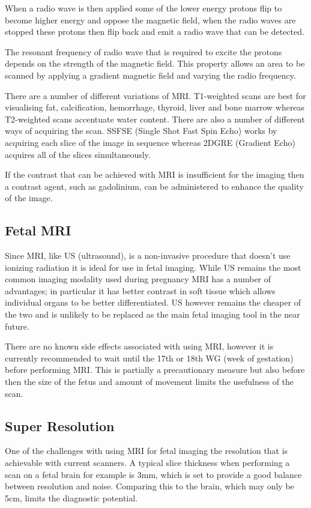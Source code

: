 \documentclass[
  oneside,
  11pt, a4paper,
  footinclude=true,
  headinclude=true,
  cleardoublepage=empty
]{scrbook}
\begin{document}
When a radio wave is then applied some of the lower energy protons flip to become higher energy and oppose the magnetic field, when the radio waves are stopped these protons then flip back and emit a radio wave that can be detected.

The resonant frequency of radio wave that is required to excite the protons depends on the strength of the magnetic field. This property allows an area to be scanned by applying a gradient magnetic field and varying the radio frequency.

There are a number of different variations of MRI. T1-weighted scans are best for visualising fat, calcification, hemorrhage, thyroid, liver and bone marrow whereas T2-weighted scans accentuate water content.
There are also a number of different ways of acquiring the scan. SSFSE (Single Shot Fast Spin Echo) works by acquiring each slice of the image in sequence whereas 2DGRE (Gradient Echo) acquires all of the slices simultaneously.

If the contrast that can be achieved with MRI is insufficient for the imaging then a contrast agent, such as gadolinium, can be administered to enhance the quality of the image.

\subsection{Fetal MRI\cite{fetalmri}}

Since MRI, like US (ultrasound), is a non-invasive procedure that doesn’t use ionizing radiation it is ideal for use in fetal imaging. While US remains the most common imaging modality used during pregnancy MRI has a number of advantages; in particular it has better contrast in soft tissue which allows individual organs to be better differentiated. US however remains the cheaper of the two and is unlikely to be replaced as the main fetal imaging tool in the near future.

There are no known side effects associated with using MRI, however it is currently recommended to wait until the 17th or 18th WG (week of gestation) before performing MRI. This is partially a precautionary measure but also before then the size of the fetus and amount of movement limits the usefulness of the scan.

\newpage
\subsection{Super Resolution\cite{superresolution1}\cite{superresolution2}}
One of the challenges with using MRI for fetal imaging the resolution that is achievable with current scanners. A typical slice thickness when performing a scan on a fetal brain for example is 3mm, which is set to provide a good balance between resolution and noise. Comparing this to the brain, which may only be 5cm, limits the diagnostic potential.
\end{document}
